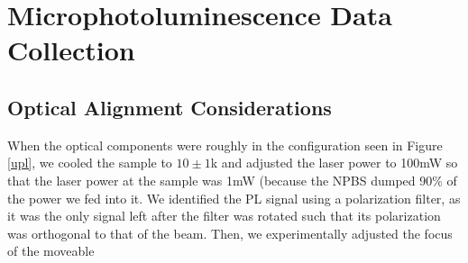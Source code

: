 \section{Microphotoluminescence Data Collection}
\subsection{Optical Alignment Considerations}
When the optical components were roughly in the configuration seen in Figure \ref{upl}, we cooled the sample to $10\pm1$k and adjusted the laser power to 100mW so that the laser power at the sample was 1mW (because the NPBS dumped 90\% of the power we fed into it. We identified the PL signal using a polarization filter, as it was the only signal left after the filter was rotated such that its polarization was orthogonal to that of the beam. Then, we experimentally adjusted the focus of the moveable



